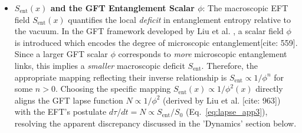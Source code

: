 \documentclass[11pt]{article}
\begin{document}
\begin{itemize}
\item \textbf{$S_{\mathrm{ent}}(x)$ and the GFT Entanglement Scalar $\phi$}: The macroscopic EFT field $S_{\mathrm{ent}}(x)$ quantifies the local \emph{deficit} in entanglement entropy relative to the vacuum. In the GFT framework developed by Liu et al. \cite{Liu2023}, a scalar field $\phi$ is introduced which encodes the degree of microscopic entanglement[cite: 559]. Since a larger GFT scalar $\phi$ corresponds to \emph{more} microscopic entanglement links, this implies a \emph{smaller} macroscopic deficit $S_{\mathrm{ent}}$. Therefore, the appropriate mapping reflecting their inverse relationship is $S_{\mathrm{ent}} \propto 1/\phi^n$ for some $n>0$. Choosing the specific mapping $S_{\mathrm{ent}}(x) \propto 1/\phi^{2}(x)$ directly aligns the GFT lapse function $N \propto 1/\phi^2$ (derived by Liu et al. [cite: 963]) with the EFT's postulate $d\tau/dt = N \propto S_{\mathrm{ent}}/S_0$ (Eq.~\eqref{eq:lapse_app3}), resolving the apparent discrepancy discussed in the 'Dynamics' section below.


\end{itemize}
\end{document}
